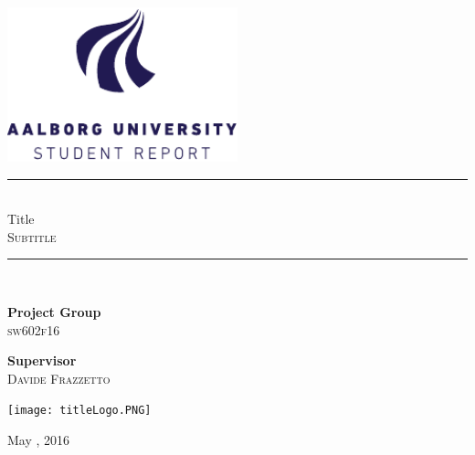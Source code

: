 \begin{titlepage}
\begin{center}
\newcommand{\HRule}{\rule{\linewidth}{0.5mm}}

\includegraphics[width=0.5\textwidth]{figures/aau_logo_en.pdf}~\\[1cm]


\vspace{2em}
\HRule \\[0.1cm]
{
\huge Title\\\large\textsc{Subtitle}\\
}

\HRule \\[1.5cm]

\begin{minipage}{0.4\textwidth}
\begin{flushleft} \large
\textbf{Project Group}\\
\textsc{sw602f16}
\end{flushleft}
\end{minipage}
\begin{minipage}{0.4\textwidth}
\begin{flushright} \large
\textbf{Supervisor} \\
\textsc{Davide Frazzetto}
\end{flushright}
\end{minipage}

\begin{center}
\texttt{[image: titleLogo.PNG]}
\end{center}


\vfill

{\large May , 2016}

\end{center}
\end{titlepage}
